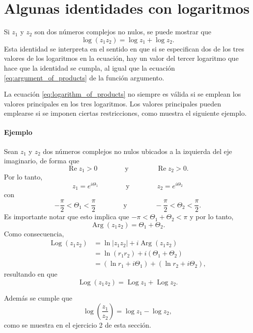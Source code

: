 \documentclass[a4paper]{report}
\renewcommand{\Re}{\operatorname{Re}}
\DeclareMathOperator{\Arg}{Arg}
\DeclareMathOperator{\Log}{Log}
\begin{document}
\section{Algunas identidades con logaritmos}

Si \(z_1\) y \(z_2\) son dos números complejos no nulos, se puede mostrar que 
\begin{equation}\label{eq:logarithm_of_products}
 \log(z_1z_2)=\log z_1+\log z_2. 
\end{equation}
Esta identidad se interpreta en el sentido en que si se especifican dos de los tres valores de los logaritmos en la ecuación, hay un valor del tercer logaritmo que hace que la identidad se cumpla, al igual que la ecuación \ref{eq:argument_of_products} de la función argumento.

La ecuación \ref{eq:logarithm_of_products} no siempre es válida si se emplean los valores principales en los tres logaritmos. Los valores principales pueden emplearse si se imponen ciertas restricciones, como muestra el siguiente ejemplo.

\paragraph{Ejemplo} Sean \(z_1\) y \(z_2\) dos números complejos no nulos ubicados a la izquierda del eje imaginario, de forma que
\[
 \Re z_1>0
 \qquad\qquad\textrm{y}\qquad\qquad
 \Re z_2>0.
\]
Por lo tanto,
\[
 z_1=e^{i\Theta_1}
 \qquad\qquad\textrm{y}\qquad\qquad
 z_2=e^{i\Theta_2}
\]
con 
\[
 -\frac{\pi}{2}<\Theta_1<\frac{\pi}{2}
 \qquad\qquad\textrm{y}\qquad\qquad
 -\frac{\pi}{2}<\Theta_2<\frac{\pi}{2}.
\]
Es importante notar que esto implica que \(-\pi<\Theta_1+\Theta_2<\pi\) y por lo tanto,
\[
 \Arg(z_1z_2)=\Theta_1+\Theta_2.
\]
Como consecuencia,
\begin{align*}
 \Log(z_1z_2)&=\ln|z_1z_2|+i\Arg(z_1z_2)\\
  &=\ln(r_1r_2)+i(\Theta_1+\Theta_2)\\
  &=(\ln r_1+i\Theta_1)+(\ln r_2+i\Theta_2),
\end{align*}
resultando en que 
\[
 \Log(z_1z_2)=\Log z_1+\Log z_2.
\]

Además se cumple que 
\begin{equation}\label{eq:logarithm_of_quotient}
 \log\left(\frac{z_1}{z_2}\right)=\log z_1-\log z_2,
\end{equation}
como se muestra en el ejercicio 2 de esta sección.
\end{document}
